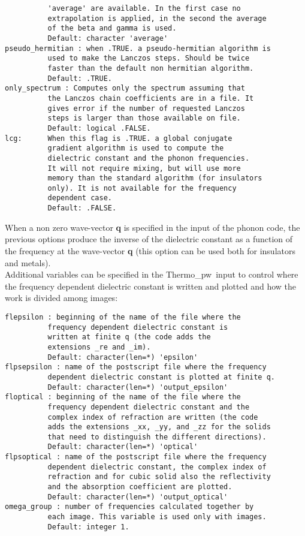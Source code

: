 \documentclass[12pt,a4paper,twoside]{report}
\def\thermo{{\sc Thermo}\_{\sc pw}}
\begin{document}
\begin{verbatim}
          'average' are available. In the first case no 
          extrapolation is applied, in the second the average 
          of the beta and gamma is used.
          Default: character 'average'
pseudo_hermitian : when .TRUE. a pseudo-hermitian algorithm is 
          used to make the Lanczos steps. Should be twice 
          faster than the default non hermitian algorithm.
          Default: .TRUE.
only_spectrum : Computes only the spectrum assuming that 
          the Lanczos chain coefficients are in a file. It 
          gives error if the number of requested Lanczos 
          steps is larger than those available on file.
          Default: logical .FALSE.
lcg:      When this flag is .TRUE. a global conjugate 
          gradient algorithm is used to compute the 
          dielectric constant and the phonon frequencies. 
          It will not require mixing, but will use more 
          memory than the standard algorithm (for insulators 
          only). It is not available for the frequency 
          dependent case.
          Default: .FALSE.
\end{verbatim}

When a non zero wave-vector {\bf q} is specified in the input of the phonon
code, the previous options produce the inverse of the dielectric 
constant as a function of the frequency at the wave-vector {\bf q}
(this option can be used both for insulators and metals). \\
Additional variables can be specified in the \thermo\ input to control
where the frequency dependent dielectric constant is written and plotted
and how the work is divided among images:

\begin{verbatim}
flepsilon : beginning of the name of the file where the 
          frequency dependent dielectric constant is 
          written at finite q (the code adds the 
          extensions _re and _im).
          Default: character(len=*) 'epsilon'
flpsepsilon : name of the postscript file where the frequency 
          dependent dielectric constant is plotted at finite q.
          Default: character(len=*) 'output_epsilon'
floptical : beginning of the name of the file where the 
          frequency dependent dielectric constant and the 
          complex index of refraction are written (the code 
          adds the extensions _xx, _yy, and _zz for the solids 
          that need to distinguish the different directions).
          Default: character(len=*) 'optical'
flpsoptical : name of the postscript file where the frequency 
          dependent dielectric constant, the complex index of 
          refraction and for cubic solid also the reflectivity 
          and the absorption coefficient are plotted.
          Default: character(len=*) 'output_optical'
omega_group : number of frequencies calculated together by 
          each image. This variable is used only with images.
          Default: integer 1.
\end{verbatim}
\end{document}
